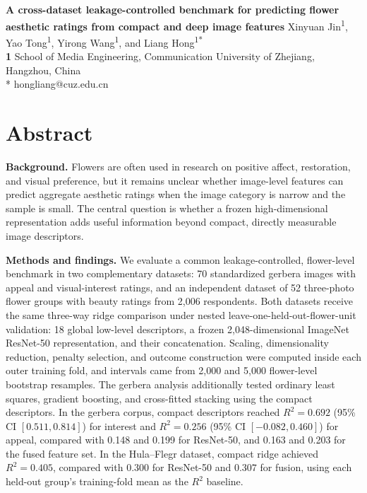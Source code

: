 \documentclass[10pt,letterpaper]{article}
\begin{document}
\vspace*{0.2in}

\begin{flushleft}
{\Large
\textbf{A cross-dataset leakage-controlled benchmark for predicting flower aesthetic ratings from compact and deep image features}
}
\newline
Xinyuan Jin\textsuperscript{1}, Yao Tong\textsuperscript{1}, Yirong Wang\textsuperscript{1}, and Liang Hong\textsuperscript{1*}
\\
\bigskip
\textbf{1} School of Media Engineering, Communication University of Zhejiang, Hangzhou, China
\\
\bigskip
* hongliang@cuz.edu.cn
\end{flushleft}

\section*{Abstract}
\textbf{Background.} Flowers are often used in research on positive affect, restoration, and visual preference, but it remains unclear whether image-level features can predict aggregate aesthetic ratings when the image category is narrow and the sample is small. The central question is whether a frozen high-dimensional representation adds useful information beyond compact, directly measurable image descriptors.

\textbf{Methods and findings.} We evaluate a common leakage-controlled, flower-level benchmark in two complementary datasets: 70 standardized gerbera images with appeal and visual-interest ratings, and an independent dataset of 52 three-photo flower groups with beauty ratings from 2,006 respondents. Both datasets receive the same three-way ridge comparison under nested leave-one-held-out-flower-unit validation: 18 global low-level descriptors, a frozen 2,048-dimensional ImageNet ResNet-50 representation, and their concatenation. Scaling, dimensionality reduction, penalty selection, and outcome construction were computed inside each outer training fold, and intervals came from 2,000 and 5,000 flower-level bootstrap resamples. The gerbera analysis additionally tested ordinary least squares, gradient boosting, and cross-fitted stacking using the compact descriptors. In the gerbera corpus, compact descriptors reached $R^2 = 0.692$ (95\% CI $[0.511, 0.814]$) for interest and $R^2 = 0.256$ (95\% CI $[-0.082, 0.460]$) for appeal, compared with 0.148 and 0.199 for ResNet-50, and 0.163 and 0.203 for the fused feature set. 
In the Hula--Flegr dataset, compact ridge achieved $R^2=0.405$, compared with $0.300$ for ResNet-50 and $0.307$ for fusion, using each held-out group's training-fold mean as the $R^2$ baseline.
\end{document}
